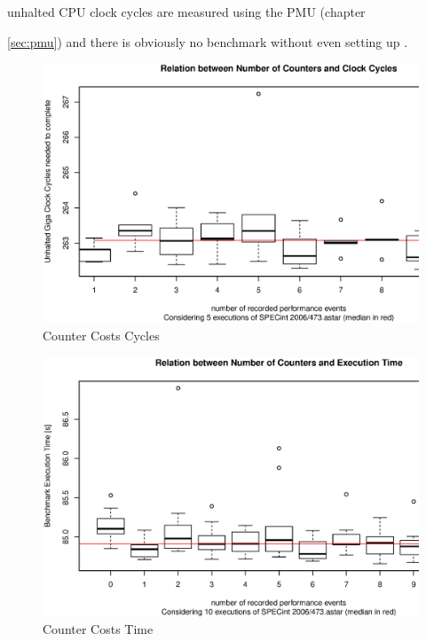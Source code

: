 unhalted CPU clock cycles are measured using the PMU (chapter {\ref{sec:pmu})
and \JWTlibpfm{} there is obviously no benchmark without even setting up
\JWTlibpfm{}.

\begin{figure}
  \centering
    \includegraphics[width=\textwidth]{fig/ctr-csts-cycles.eps}
  \caption{Counter Costs Cycles}
  \label{fig:ctr-costs-cycles}
\end{figure}

\begin{figure}
  \centering
    \includegraphics[width=\textwidth]{fig/ctr-csts-time.eps}
  \caption{Counter Costs Time}
  \label{fig:ctr-costs-time}
\end{figure}

}
